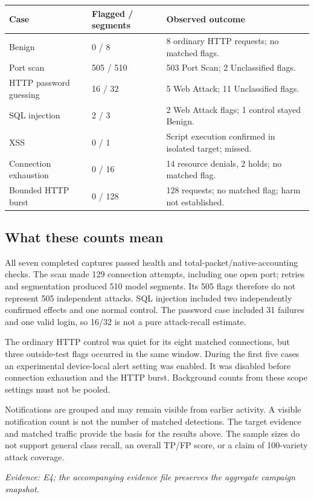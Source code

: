 \documentclass[11pt,a4paper]{article}
\newcommand{\source}[1]{{\small\textit{Evidence: #1.}\par}}
\begin{document}
\begin{tabularx}{\textwidth}{@{}L{31mm}L{22mm}Y@{}}
\toprule Case & Flagged / segments & Observed outcome\\\midrule
Benign & 0 / 8 & 8 ordinary HTTP requests; no matched flags. \\
Port scan & 505 / 510 & 503 Port Scan; 2 Unclassified flags. \\
HTTP password guessing & 16 / 32 & 5 Web Attack; 11 Unclassified flags. \\
SQL injection & 2 / 3 & 2 Web Attack flags; 1 control stayed Benign. \\
XSS & 0 / 1 & Script execution confirmed in isolated target; missed. \\
Connection exhaustion & 0 / 16 & 14 resource denials, 2 holds; no matched flag. \\
Bounded HTTP burst & 0 / 128 & 128 requests; no matched flag; harm not established. \\
\bottomrule
\end{tabularx}

\subsection*{What these counts mean}
All seven completed captures passed health and total-packet/native-accounting checks.
The scan made 129 connection attempts, including one open port; retries and segmentation
produced 510 model segments. Its 505 flags therefore do not represent 505 independent
attacks. SQL injection included two independently confirmed effects and one normal control.
The password case included 31 failures and one valid login, so 16/32 is not a pure
attack-recall estimate.

The ordinary HTTP control was quiet for its eight matched connections, but three
outside-test flags occurred in the same window. During the first five cases an experimental
device-local alert setting was enabled. It was disabled before connection exhaustion
and the HTTP burst. Background counts from these scope settings must not be pooled.

Notifications are grouped and may remain visible from earlier activity. A visible
notification count is not the number of matched detections. The target evidence and
matched traffic provide the basis for the results above. The sample sizes do not support
general class recall, an overall TP/FP score, or a claim of 100-variety attack coverage.
\source{E4; the accompanying evidence file preserves the aggregate campaign snapshot}
\end{document}
